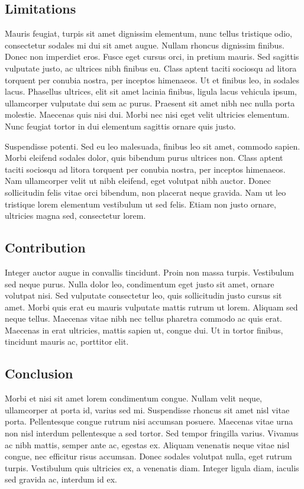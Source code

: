 \subsection{Limitations}

Mauris feugiat, turpis sit amet dignissim elementum, nunc tellus tristique odio, consectetur sodales mi dui sit amet augue. Nullam rhoncus dignissim finibus. Donec non imperdiet eros. Fusce eget cursus orci, in pretium mauris. Sed sagittis vulputate justo, ac ultrices nibh finibus eu. Class aptent taciti sociosqu ad litora torquent per conubia nostra, per inceptos himenaeos. Ut et finibus leo, in sodales lacus. Phasellus ultrices, elit sit amet lacinia finibus, ligula lacus vehicula ipsum, ullamcorper vulputate dui sem ac purus. Praesent sit amet nibh nec nulla porta molestie. Maecenas quis nisi dui. Morbi nec nisi eget velit ultricies elementum. Nunc feugiat tortor in dui elementum sagittis ornare quis justo.

Suspendisse potenti. Sed eu leo malesuada, finibus leo sit amet, commodo sapien. Morbi eleifend sodales dolor, quis bibendum purus ultrices non. Class aptent taciti sociosqu ad litora torquent per conubia nostra, per inceptos himenaeos. Nam ullamcorper velit ut nibh eleifend, eget volutpat nibh auctor. Donec sollicitudin felis vitae orci bibendum, non placerat neque gravida. Nam ut leo tristique lorem elementum vestibulum ut sed felis. Etiam non justo ornare, ultricies magna sed, consectetur lorem.

\subsection{Contribution}

Integer auctor augue in convallis tincidunt. Proin non massa turpis. Vestibulum sed neque purus. Nulla dolor leo, condimentum eget justo sit amet, ornare volutpat nisi. Sed vulputate consectetur leo, quis sollicitudin justo cursus sit amet. Morbi quis erat eu mauris vulputate mattis rutrum ut lorem. Aliquam sed neque tellus. Maecenas vitae nibh nec tellus pharetra commodo ac quis erat. Maecenas in erat ultricies, mattis sapien ut, congue dui. Ut in tortor finibus, tincidunt mauris ac, porttitor elit.

\subsection{Conclusion}

Morbi et nisi sit amet lorem condimentum congue. Nullam velit neque, ullamcorper at porta id, varius sed mi. Suspendisse rhoncus sit amet nisl vitae porta. Pellentesque congue rutrum nisi accumsan posuere. Maecenas vitae urna non nisl interdum pellentesque a sed tortor. Sed tempor fringilla varius. Vivamus ac nibh mattis, semper ante ac, egestas ex. Aliquam venenatis neque vitae nisl congue, nec efficitur risus accumsan. Donec sodales volutpat nulla, eget rutrum turpis. Vestibulum quis ultricies ex, a venenatis diam. Integer ligula diam, iaculis sed gravida ac, interdum id ex.
